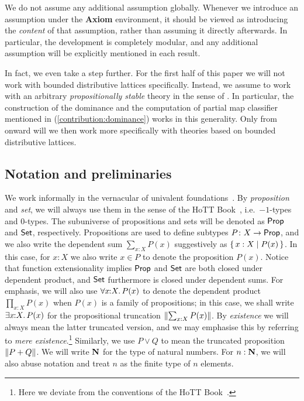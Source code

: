 We do not assume any additional assumption globally. Whenever we introduce an assumption under the \textbf{Axiom} environment, it should be viewed as introducing the \emph{content} of that assumption, rather than assuming it directly afterwards. In particular, the development is completely modular, and any additional assumption will be explicitly mentioned in each result.

In fact, we even take a step further. For the first half of this paper we will not work with bounded distributive lattices specifically. Instead, we assume to work with an arbitrary \emph{propositionally stable} theory in the sense of . In particular, the construction of the dominance and the computation of partial map classifier mentioned in  (\ref{contribution:dominance}) works in this generality. Only from  onward will we then work more specifically with theories based on bounded distributive lattices.

\subsection*{Notation and preliminaries}
We work informally in the vernacular of univalent foundations~\citep{hottbook}.
By \emph{proposition} and \emph{set}, we will always use them in the sense of the HoTT Book~\citep{hottbook}, i.e.\ $-1$-types and $0$-types. The subuniverse of propositions and sets will be denoted as $\mathsf{Prop}$ and $\mathsf{Set}$, respectively. Propositions are used to define subtypes $P \colon X \to \mathsf{Prop}$, and we also write the dependent sum $\sum_{x:X}P(x)$ suggestively as $\{\,x:X\mid P(x)\,\}$. In this case, for $x:X$ we also write $x\in P$ to denote the proposition $P(x)$. Notice that function extensionality implies $\mathsf{Prop}$ and $\mathsf{Set}$ are both closed under dependent product, and $\mathsf{Set}$ furthermore is closed under dependent sums. For emphasis, we will also use $\forall x\!\colon\!\!X\mathpunct{.}P(x)$ to denote the dependent product $\prod_{x:X}P(x)$ when $P(x)$ is a family of propositions; in this case, we shall write $\exists x\!\colon\!\!X\mathpunct{.}P(x)$ for the propositional truncation $\lVert \sum_{x:X}P(x)\rVert$. By \emph{existence} we will always mean the latter truncated version, and we may emphasise this by referring to \emph{mere existence}.\footnote{Here we deviate from the conventions of the HoTT Book~\citep{hottbook}.} Similarly, we use $P \vee Q$ to mean the truncated proposition $\lVert P + Q\rVert$. We will write $\mathbf{N}$ for the type of natural numbers. For $n:\mathbf{N}$, we will also abuse notation and treat $n$ as the finite type of $n$ elements. 


